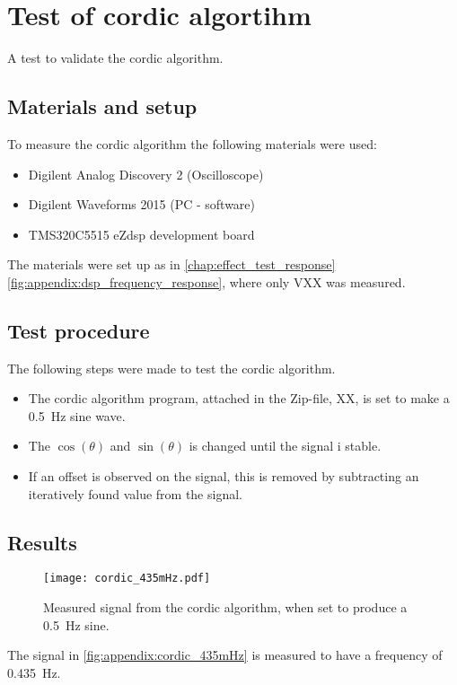 \chapter{Test of \gls{cordic} algortihm}\label{app:cordic_shape}
A test to validate the \gls{cordic} algorithm.

\section*{Materials and setup}
To measure the \gls{cordic} algorithm the following materials were used:
\begin{itemize}
\item Digilent Analog Discovery 2 (Oscilloscope)
\item Digilent Waveforms 2015 (PC - software)
\item TMS320C5515 eZdsp development board
\end{itemize}

The materials were set up as in \autoref{chap:effect_test_response} \autoref{fig:appendix:dsp_frequency_response}, where only VXX  was measured.

\section*{Test procedure}
The following steps were made to test the \gls{cordic} algorithm.
\begin{itemize}
\item The \gls{cordic} algorithm program, attached in the Zip-file, XX, is set to make a \SI{0.5}{\hertz} sine wave.
\item The $\cos(\theta)$ and $\sin(\theta)$ is changed until the signal i stable.
\item If an offset is observed on the signal, this is removed by subtracting an iteratively found value from the signal.
\end{itemize} 

\section*{Results} 

\begin{figure}[htbp!]
	\centering
		\texttt{[image: cordic\_435mHz.pdf]}
		\caption{Measured signal from the \gls{cordic} algorithm, when set to produce a \SI{0.5}{\hertz} sine.}
		\label{fig:appendix:cordic_435mHz}
\end{figure}

The signal in \autoref{fig:appendix:cordic_435mHz} is measured to have a frequency of \SI{0.435}{\hertz}.